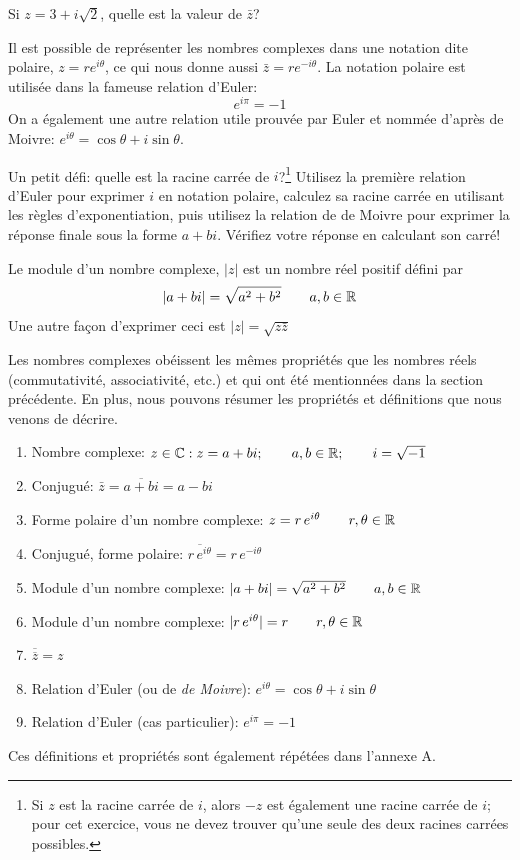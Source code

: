 \begin{exerciceB}
Si $z = 3 + i\sqrt{2}$, quelle est la valeur de $\bar{z}$?
\end{exerciceB}

Il est possible de représenter les nombres complexes dans une notation dite polaire, $z = r e^{i\theta}$,
ce qui nous donne aussi $\bar{z} = r e^{-i\theta}$.  La notation polaire est utilisée dans la 
fameuse relation d'Euler:
\[
e^{i\pi} = -1
\]
On a également une autre relation utile prouvée par Euler et nommée d'après de Moivre: $e^{i\theta} = \cos\theta + i\sin\theta$.

\begin{exerciceB}
Un petit défi: quelle est la racine carrée de $i$?\footnote{Si $z$ est la racine carrée de $i$, alors $-z$ est également
une racine carrée de $i$; pour cet exercice, vous ne devez trouver qu'une seule des deux racines carrées possibles.}
\suggestion Utilisez la première relation d'Euler pour exprimer $i$ en notation polaire, calculez sa
racine carrée en utilisant les règles d'exponentiation, puis utilisez la relation de de Moivre pour exprimer la réponse
finale sous la forme $a+bi$. Vérifiez votre réponse en calculant son carré!
\end{exerciceB}
Le module d'un nombre complexe, $|z|$ est un nombre réel positif défini par
\[
|a + bi| = \sqrt{a^2 + b^2} \qquad a,b \in \mathbb{R}
\]
Une autre façon d'exprimer ceci est $|z| = \sqrt{z\bar{z}}$

Les nombres complexes obéissent les mêmes propriétés que les nombres réels (commutativité, associativité, etc.) et
qui ont été mentionnées dans la section précédente.  En plus, nous pouvons résumer les propriétés et définitions
que nous venons de décrire.
\begin{enumerate}
\item Nombre complexe: $z\in\mathbb{C}: z = a + bi; \qquad a,b\in\mathbb{R}; \qquad i=\sqrt{-1}$
\item Conjugué: $\bar{z} = \overline{a+bi} = a-bi$
\item Forme polaire d'un nombre complexe: $z=r\,e^{i\theta} \qquad r, \theta \in \mathbb{R}$
\item Conjugué, forme polaire: $\overline{r\,e^{i\theta}} =r\, e^{-i\theta}$
\item Module d'un nombre complexe: $|a + bi| = \sqrt{a^2 + b^2} \qquad a,b \in \mathbb{R}$
\item Module d'un nombre complexe: $|r\,e^{i\theta}| = r \qquad r,\theta \in \mathbb{R}$
\item $\overline{\overline{z}} = z$
\item Relation d'Euler (ou de \textit{de Moivre}): $e^{i\theta} = \cos\theta + i\sin\theta$
\item Relation d'Euler (cas particulier): $e^{i\pi} = -1$
\end{enumerate}
Ces définitions et propriétés sont également répétées dans l'annexe A.
